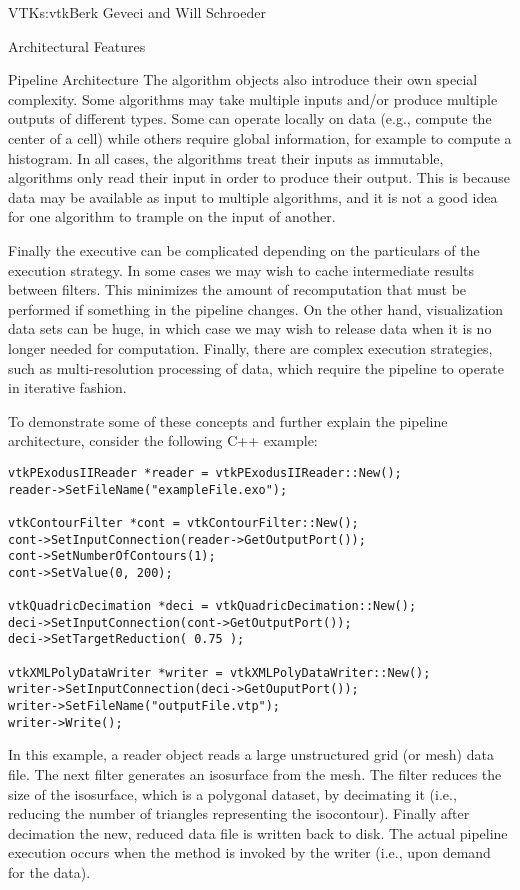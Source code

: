 \begin{aosachapter}{VTK}{s:vtk}{Berk Geveci and Will Schroeder}
\begin{aosasect1}{Architectural Features}
\begin{aosasect2}{Pipeline Architecture}
The algorithm objects also introduce their own special
complexity. Some algorithms may take multiple inputs and/or produce
multiple outputs of different types. Some can operate locally on data
(e.g., compute the center of a cell) while others require global
information, for example to compute a histogram. In all cases, the
algorithms treat their inputs as immutable, algorithms only read their
input in order to produce their output. This is because data may be
available as input to multiple algorithms, and it is not a good idea
for one algorithm to trample on the input of another.

Finally the executive can be complicated depending on the particulars
of the execution strategy. In some cases we may wish to cache
intermediate results between filters. This minimizes the amount of
recomputation that must be performed if something in the pipeline
changes. On the other hand, visualization data sets can be huge, in
which case we may wish to release data when it is no longer needed for
computation. Finally, there are complex execution strategies, such as
multi-resolution processing of data, which require the pipeline to
operate in iterative fashion.

To demonstrate some of these concepts and further explain the pipeline
architecture, consider the following C++ example:

\begin{verbatim}
vtkPExodusIIReader *reader = vtkPExodusIIReader::New();
reader->SetFileName("exampleFile.exo");

vtkContourFilter *cont = vtkContourFilter::New();
cont->SetInputConnection(reader->GetOutputPort());
cont->SetNumberOfContours(1);
cont->SetValue(0, 200);

vtkQuadricDecimation *deci = vtkQuadricDecimation::New();
deci->SetInputConnection(cont->GetOutputPort());
deci->SetTargetReduction( 0.75 );

vtkXMLPolyDataWriter *writer = vtkXMLPolyDataWriter::New();
writer->SetInputConnection(deci->GetOuputPort());
writer->SetFileName("outputFile.vtp");
writer->Write();
\end{verbatim}

\noindent In this example, a reader object reads a large unstructured grid (or
mesh) data file. The next filter generates an isosurface from the
mesh. The  filter reduces the size of the
isosurface, which is a polygonal dataset, by decimating it (i.e.,
reducing the number of triangles representing the isocontour). Finally
after decimation the new, reduced data file is written back to
disk. The actual pipeline execution occurs when the 
method is invoked by the writer (i.e., upon demand for the data).


\end{aosasect2}
\end{aosasect1}
\end{aosachapter}
